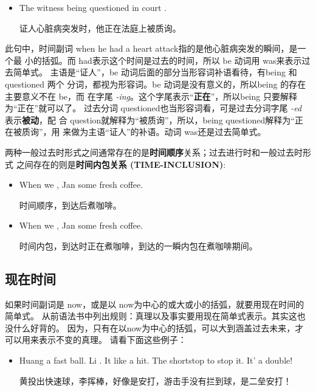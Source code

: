 \begin{itemize}
\item  The witness  being questioned in court  .

证人心脏病突发时，他正在法庭上被质询。
\end{itemize}

此句中，时间副词 when he had a heart attack指的是他心脏病突发的瞬间，是一个最
小的括弧。而 had表示这个时间是过去的时间，所以 be 动词用 was来表示过去简单式。
主语是“证人”，be 动词后面的部分当形容词补语看待，有being 和 questioned 两个
分词，都视为形容词。be 动词是没有意义的，所以being 的存在主要意义不在 be，而
在字尾 \emph{-ing}。这个字尾表示“\textbf{正在}”，所以being 只要解释为“正在”就可以了。
过去分词 questioned也当形容词看，可是过去分词字尾 \emph{-ed} 表示\textbf{被动}，配
合 question就解释为“被质询”，所以，being questioned解释为“正在被质询”，用
来做为主语“证人”的补语。动词 was还是过去简单式。

两种一般过去时形式之间通常存在的是\textbf{时间顺序}关系；过去进行时和一般过去时形式
之间存在的则是\textbf{时间内包关系 (TIME-INCLUSION)}:
\begin{itemize}
\item When we , Jan  some fresh coffee.

  时间顺序，到达后煮咖啡。

\item When we , Jan some fresh coffee.

  时间内包，到达时正在煮咖啡，到达的一瞬内包在煮咖啡期间。
\end{itemize}

\subsection{现在时间}

如果时间副词是 now，或是以 now为中心的或大或小的括弧，就要用现在时间的简单式。
从前语法书中列出规则：真理以及事实要用现在简单式表示。其实这也没什么好背的。
因为，只有在以now为中心的括弧，可以大到涵盖过去未来，才可以用来表示不变的真理。
请看下面这些例子：

\begin{itemize}
\item Huang  a fast ball. Li . It  like a hit. The shortstop
   to stop it. It' a double!

  黄投出快速球，李挥棒，好像是安打，游击手没有拦到球，是二垒安打！
\end{itemize}

